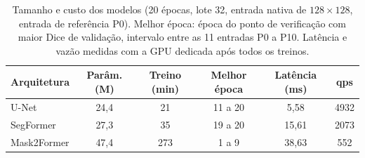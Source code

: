 \begin{table}[t]
\centering
\caption{Tamanho e custo dos modelos (20 épocas, lote 32, entrada nativa de $128\times128$, entrada de referência P0). Melhor época: época do ponto de verificação com maior Dice de validação, intervalo entre as 11 entradas P0 a P10. Latência e vazão medidas com a GPU dedicada após todos os treinos.}
\label{tab:cost}
\scriptsize
\setlength{\tabcolsep}{3pt}
\begin{tabularx}{\columnwidth}{Y c c c c c}
\toprule
\textbf{Arquitetura} & \textbf{Parâm. (M)} & \textbf{Treino (min)} & \textbf{Melhor época} & \textbf{Latência (ms)} & \textbf{qps} \\
\midrule
U-Net & 24,4 & 21 & 11 a 20 & 5,58 & 4932 \\
SegFormer & 27,3 & 35 & 19 a 20 & 15,61 & 2073 \\
Mask2Former & 47,4 & 273 & 1 a 9 & 38,63 & 552 \\
\bottomrule
\end{tabularx}
\end{table}
